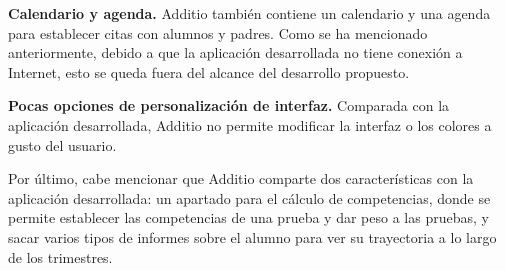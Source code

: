 \textbf {Calendario y agenda.} Additio también contiene un calendario y una agenda para establecer citas con alumnos y padres. Como se ha mencionado anteriormente, debido a que la aplicación desarrollada no tiene conexión a Internet, esto se queda fuera del alcance del desarrollo propuesto.

\textbf {Pocas opciones de personalización de interfaz.} Comparada con la aplicación desarrollada, Additio no permite modificar la interfaz o los colores a gusto del usuario.

Por último, cabe mencionar que Additio comparte dos características con la aplicación desarrollada: un apartado para el cálculo de competencias, donde se permite establecer las competencias de una prueba y dar peso a las pruebas, y sacar varios tipos de informes sobre el alumno para ver su trayectoria a lo largo de los trimestres.
